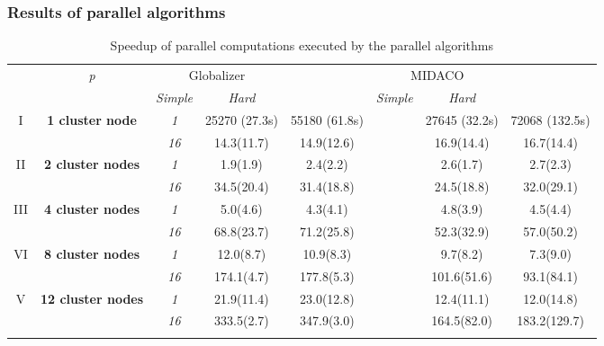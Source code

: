 \documentclass[aspectratio=1610]{beamer}
\begin{document}
\begin{frame}
  \frametitle{Results of parallel algorithms}
  \begin{table}
    \centering
    \caption{Speedup of parallel computations executed by the parallel algorithms}
    \label{tab:speedup}
    \begin{tabular}{cccccccc}
      \cline{3-8}\noalign{\smallskip}
      \multicolumn{2}{c}{  } & \textit{p} & \multicolumn{2}{c}{Globalizer} & &
  \multicolumn{2}{c}{MIDACO}   \\
      \noalign{\smallskip} \cline{4-5} \cline{7-8}  \noalign{\smallskip}
      \multicolumn{2}{c}{  } & & \textit{Simple} & \textit{Hard} & & \textit{Simple} &
  \textit{Hard}  \\
      \noalign{\smallskip}\hline
  I  & \textbf{1 cluster node}  %
      & \textit{1}   & 25270 (27.3s) & 55180 (61.8s) & & 27645 (32.2s) & 72068 (132.5s)  \\
    &  & \textit{16} & 14.3(11.7) & 14.9(12.6)  & &  16.9(14.4) & 16.7(14.4) \\
    \hline \noalign{\smallskip}
  II  & \textbf{2 cluster nodes}  %
    & \textit{1}      &   1.9(1.9) & 2.4(2.2)  & & 2.6(1.7) & 2.7(2.3) \\
    &   & \textit{16} & 34.5(20.4) & 31.4(18.8) & & 24.5(18.8) & 32.0(29.1) \\
      \noalign{\smallskip}\hline	\noalign{\smallskip}
  III  & \textbf{4 cluster nodes}  %
  & \textit{1}      & 5.0(4.6) & 4.3(4.1) & & 4.8(3.9) & 4.5(4.4) \\
  &   & \textit{16} & 68.8(23.7) & 71.2(25.8) & & 52.3(32.9) & 57.0(50.2) \\
    \noalign{\smallskip}\hline	\noalign{\smallskip}
  VI & \textbf{8 cluster nodes} %
  & \textit{1}    & 12.0(8.7) & 10.9(8.3) & & 9.7(8.2)    & 7.3(9.0)    \\
  & & \textit{16} & 174.1(4.7) & 177.8(5.3) & & 101.6(51.6) & 93.1(84.1) \\
      \noalign{\smallskip}\hline
      V & \textbf{12 cluster nodes} %
      & \textit{1}    & 21.9(11.4)  & 23.0(12.8)  & & 12.4(11.1)  & 12.0(14.8)  \\
      & & \textit{16} & 333.5(2.7) & 347.9(3.0) & & 164.5(82.0) & 183.2(129.7) \\
          \noalign{\smallskip}\hline
    \end{tabular}
  \end{table}
\end{frame}
\end{document}
